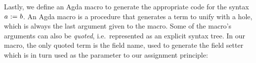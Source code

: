 \documentclass[sigplan]{acmart}%
\begin{document}
Lastly, we define an Agda macro to generate the appropriate code 
for the syntax $a\ \AgdaMacro{\ensuremath{:=}}\ b$. An Agda macro 
is a  procedure that generates a term to unify with 
a hole, which is always the last argument given to the macro. Some 
of the macro's arguments can also be \emph{quoted}, i.e.\ represented
as an explicit syntax tree. In our macro, the only quoted term is the
field name, used to generate the field setter which is in turn used 
as the parameter to our assignment principle:
\begin{code}
\>[3]\<%
\\
\>[3][@{}l@{\AgdaIndent{0}}]%
\>[4]%
\>[1904I]\AgdaSymbol{:}%
\>[1905I]\AgdaSymbol{\{}\AgdaSpace{}%
\AgdaSymbol{:}\AgdaSpace{}%
\AgdaSymbol{\}\{}\AgdaSpace{}%
\AgdaSymbol{:}\AgdaSpace{}%
\AgdaSymbol{\}}\<%
\\
\>[.][@{}l@{}]\<[1905I]%
\>[12]\AgdaSymbol{(}\AgdaSpace{}%
\AgdaSymbol{:}%
\>[18]\AgdaSpace{}%
\AgdaSpace{}%
\AgdaSymbol{:}\AgdaSpace{}%
\AgdaSpace{}%
\AgdaSpace{}%
\AgdaSpace{}%
\AgdaSymbol{)}\<%
\\
\>[.][@{}l@{}]\<[1904I]%
\>[10]\AgdaSpace{}%
\<%
\\
%
\>[10]\AgdaSpace{}%
\AgdaSpace{}%
\AgdaSpace{}%
\AgdaSpace{}%
\<%
\\
%
\>[4]\AgdaSpace{}%
\AgdaSymbol{\{}\AgdaSymbol{\}}\AgdaSpace{}%
\AgdaSpace{}%
\AgdaSpace{}%
\AgdaSpace{}%
\AgdaSymbol{=}\AgdaSpace{}%
\<%
\\
\>[4][@{}l@{\AgdaIndent{0}}]%
\>[8]\AgdaSpace{}%
\AgdaSpace{}%
\AgdaSpace{}%
\<%
\\
%
\>[8]\AgdaSpace{}%
\AgdaSpace{}%
\AgdaSpace{}%
\AgdaSymbol{(}\AgdaSpace{}%
\AgdaSymbol{\{}\AgdaSymbol{\}}\AgdaSpace{}%
\AgdaSpace{}%
\AgdaSymbol{)}\<%
\\
%
\>[8]\AgdaSpace{}%
\AgdaSpace{}%
\<%
\\
%
\>[4]\AgdaSpace{}%
\AgdaSpace{}%
\AgdaSpace{}%
\AgdaSpace{}%
\AgdaSymbol{=}\AgdaSpace{}%
\AgdaSpace{}%
\AgdaSpace{}%
\<%
\end{code}
\end{document}
